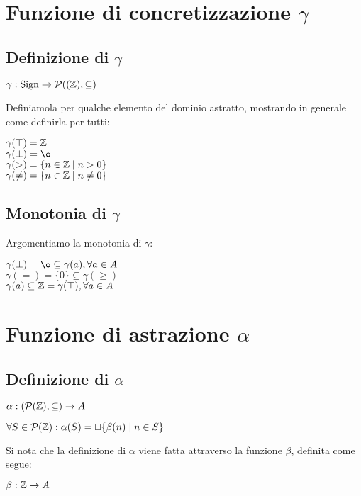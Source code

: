 \newpage

\section{Funzione di concretizzazione $\gamma$}

\subsection{Definizione di $\gamma$}
\begin{center}
	$ \gamma : \mathrm{Sign} \rightarrow \mathcal{P}({(\mathbb{Z}), \subseteq)} $
\end{center}

Definiamola per qualche elemento del dominio astratto, mostrando in generale come definirla per tutti:
\begin{center}
	$ \gamma(\top) = \mathbb{Z} $ \\
	$ \gamma(\bot) = \o $ \\
	$ \gamma(>) = \{ n \in \mathbb{Z} \mid n > 0 \} $ \\
	$ \gamma(\neq) = \{ n \in \mathbb{Z} \mid n \neq 0 \} $
\end{center}

\subsection{Monotonia di $\gamma$}
Argomentiamo la monotonia di $\gamma$:
\begin{center}
	$ \gamma(\bot) = \o \subseteq \gamma(a) , \forall a \in A $ \\
	$ \gamma(=) = \{0\} \subseteq \gamma(\geq) $ \\
	$ \gamma(a) \subseteq \mathbb{Z} = \gamma(\top), \forall a \in A $
\end{center}

\section{Funzione di astrazione $\alpha$}

\subsection{Definizione di $\alpha$}
\begin{center}
	$ \alpha : (\mathcal{P}{(\mathbb{Z}), \subseteq)} \rightarrow A $
\end{center}
\begin{center}
	$ \forall S \in \mathcal{P}(\mathbb{Z}) : \alpha(S) = \sqcup \{ \beta(n) \mid n \in S \} $
\end{center}
Si nota che la definizione di $\alpha$ viene fatta attraverso la funzione $\beta$, definita come segue:
\begin{center}
	$ \beta: \mathbb{Z} \rightarrow A  $
\end{center}

